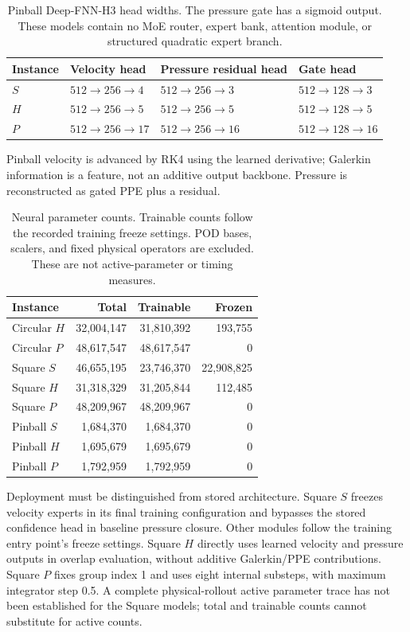 \begin{table}[t]
\centering
\small
\caption{Pinball Deep-FNN-H3 head widths. The pressure gate has a
sigmoid output. These models contain no MoE router, expert bank,
attention module, or structured quadratic expert branch.}
\label{tab:pinball_head_widths}
\begin{tabular}{@{}llll@{}}
\toprule
Instance & Velocity head & Pressure residual head & Gate head\\
\midrule
$S$ & $512\!\to\!256\!\to\!4$ & $512\!\to\!256\!\to\!3$ & $512\!\to\!128\!\to\!3$\\
$H$ & $512\!\to\!256\!\to\!5$ & $512\!\to\!256\!\to\!5$ & $512\!\to\!128\!\to\!5$\\
$P$ & $512\!\to\!256\!\to\!17$ & $512\!\to\!256\!\to\!16$ & $512\!\to\!128\!\to\!16$\\
\bottomrule
\end{tabular}
\end{table}

Pinball velocity is advanced by RK4 using the learned derivative;
Galerkin information is a feature, not an additive output backbone.
Pressure is reconstructed as gated PPE plus a residual.

\begin{table}[t]
\centering
\small
\caption{Neural parameter counts. Trainable counts follow the recorded
training freeze settings. POD bases, scalers, and fixed physical
operators are excluded. These are not active-parameter or timing measures.}
\label{tab:verified_local_parameters}
\begin{tabular}{@{}lrrr@{}}
\toprule
Instance & Total & Trainable & Frozen\\
\midrule
Circular $H$ & 32,004,147 & 31,810,392 & 193,755\\
Circular $P$ & 48,617,547 & 48,617,547 & 0\\
Square $S$ & 46,655,195 & 23,746,370 & 22,908,825\\
Square $H$ & 31,318,329 & 31,205,844 & 112,485\\
Square $P$ & 48,209,967 & 48,209,967 & 0\\
Pinball $S$ & 1,684,370 & 1,684,370 & 0\\
Pinball $H$ & 1,695,679 & 1,695,679 & 0\\
Pinball $P$ & 1,792,959 & 1,792,959 & 0\\
\bottomrule
\end{tabular}
\end{table}

Deployment must be distinguished from stored architecture.
Square $S$ freezes velocity experts in its final training configuration
and bypasses the stored confidence head in baseline pressure closure.
Other modules follow the training entry point's freeze settings.
Square $H$ directly uses learned velocity and pressure outputs in
overlap evaluation, without additive Galerkin/PPE contributions.
Square $P$ fixes group index 1 and uses eight internal substeps,
with maximum integrator step 0.5. A complete physical-rollout active
parameter trace has not been established for the Square models;
total and trainable counts cannot substitute for active counts.

